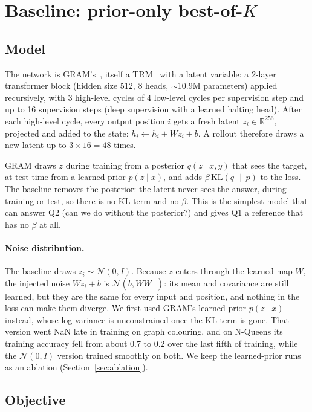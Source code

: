 \documentclass[11pt]{article}
\begin{document}
\section{Baseline: prior-only best-of-$K$}

\subsection{Model}

The network is GRAM's~\cite{baek2026gram}, itself a TRM~\cite{jolicoeur2025trm} with a latent variable: a 2-layer
transformer block (hidden size 512, 8 heads, $\sim$10.9M parameters) applied recursively, with 3 high-level cycles of
4 low-level cycles per supervision step and up to 16 supervision steps (deep supervision with a learned halting head).
After each high-level cycle, every output position $i$ gets a fresh latent $z_i\in\mathbb{R}^{256}$, projected and
added to the state: $h_i \leftarrow h_i + W z_i + b$. A rollout therefore draws a new latent up to $3\times16=48$
times.

GRAM draws $z$ during training from a posterior $q(z\mid x, y)$ that sees the target, at test time from a learned prior
$p(z\mid x)$, and adds $\beta\,\mathrm{KL}(q\,\|\,p)$ to the loss. The baseline removes the posterior: the latent never
sees the answer, during training or test, so there is no KL term and no $\beta$. This is the simplest model that can
answer Q2 (can we do without the posterior?) and gives Q1 a reference that has no $\beta$ at all.

\paragraph{Noise distribution.} The baseline draws $z_i\sim\mathcal{N}(0,I)$. Because $z$ enters through the learned
map $W$, the injected noise $Wz_i+b$ is $\mathcal{N}(b, WW^\top)$: its mean and covariance are still learned, but they
are the same for every input and position, and nothing in the loss can make them diverge. We first used GRAM's learned
prior $p(z\mid x)$ instead, whose log-variance is unconstrained once the KL term is gone. That version went NaN late in
training on graph colouring, and on N-Queens its training accuracy fell from about 0.7 to 0.2 over the last fifth of
training, while the $\mathcal{N}(0,I)$ version trained smoothly on both. We keep the learned-prior runs as an ablation
(Section~\ref{sec:ablation}).

\subsection{Objective}
\end{document}
